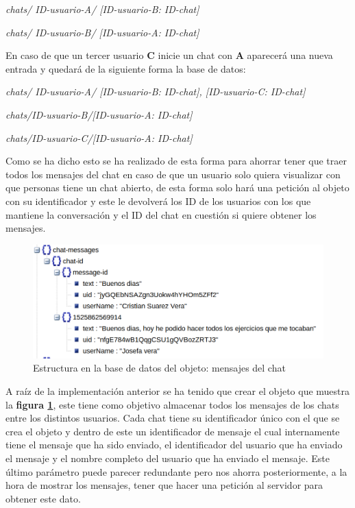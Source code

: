 \smallskip
\textit{chats/ ID-usuario-A/ [ID-usuario-B: ID-chat]}

\smallskip
\textit{chats/ ID-usuario-B/ [ID-usuario-A: ID-chat]}

\smallskip
En caso de que un tercer usuario \textbf{C} inicie un chat con \textbf{A}
aparecerá una nueva entrada y quedará de la siguiente forma la base de datos:

\smallskip
\textit{chats/ ID-usuario-A/ [ID-usuario-B: ID-chat], [ID-usuario-C: ID-chat]}

\smallskip
\textit{chats/ID-usuario-B/[ID-usuario-A: ID-chat]}

\smallskip
\textit{chats/ID-usuario-C/[ID-usuario-A: ID-chat]}

\smallskip
Como se ha dicho esto se ha realizado de esta forma para ahorrar
tener que traer todos los
mensajes del chat en caso de que un usuario solo quiera visualizar con
que personas tiene un chat abierto, de esta forma solo hará una petición
al objeto con su identificador y este le devolverá los ID de los usuarios
con los que mantiene la conversación y el ID del chat en cuestión si quiere
obtener los mensajes.

\medskip
\begin{figure}
    \includegraphics[width=\linewidth]{./images/database/chat-messages-database.png}
    \caption{Estructura en la base de datos del objeto: mensajes del chat}
    \label{mensajes-del-chat}
\end{figure}

A raíz de la implementación anterior se ha tenido que crear el objeto
que muestra la \textbf{figura \ref{mensajes-del-chat}}, este tiene como
objetivo almacenar todos los mensajes de los chats entre los distintos
usuarios. Cada chat tiene su identificador único con el que se crea el
objeto y dentro de este un identificador de mensaje el cual internamente
tiene el mensaje que ha sido enviado, el identificador del usuario que
ha enviado el mensaje y el nombre completo del usuario que ha enviado
el mensaje. Este último parámetro puede parecer redundante pero nos
ahorra posteriormente, a la hora de mostrar los mensajes, tener que hacer
una petición al servidor para obtener este dato.

